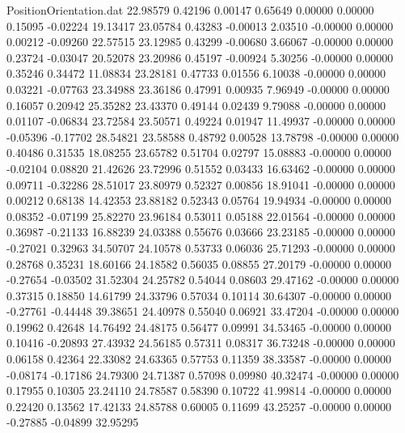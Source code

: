 \begin{filecontents}{PositionOrientation.dat}
  22.98579    0.42196    0.00147     0.65649    0.00000    0.00000    0.15095   -0.02224   19.13417
  23.05784    0.43283   -0.00013     2.03510   -0.00000    0.00000    0.00212   -0.09260   22.57515
  23.12985    0.43299   -0.00680     3.66067   -0.00000    0.00000    0.23724   -0.03047   20.52078
  23.20986    0.45197   -0.00924     5.30256   -0.00000    0.00000    0.35246    0.34472   11.08834
  23.28181    0.47733    0.01556     6.10038   -0.00000    0.00000    0.03221   -0.07763   23.34988
  23.36186    0.47991    0.00935     7.96949   -0.00000    0.00000    0.16057    0.20942   25.35282
  23.43370    0.49144    0.02439     9.79088   -0.00000    0.00000    0.01107   -0.06834   23.72584
  23.50571    0.49224    0.01947    11.49937   -0.00000    0.00000   -0.05396   -0.17702   28.54821
  23.58588    0.48792    0.00528    13.78798   -0.00000    0.00000    0.40486    0.31535   18.08255
  23.65782    0.51704    0.02797    15.08883   -0.00000    0.00000   -0.02104    0.08820   21.42626
  23.72996    0.51552    0.03433    16.63462   -0.00000    0.00000    0.09711   -0.32286   28.51017
  23.80979    0.52327    0.00856    18.91041   -0.00000    0.00000    0.00212    0.68138   14.42353
  23.88182    0.52343    0.05764    19.94934   -0.00000    0.00000    0.08352   -0.07199   25.82270
  23.96184    0.53011    0.05188    22.01564   -0.00000    0.00000    0.36987   -0.21133   16.88239
  24.03388    0.55676    0.03666    23.23185   -0.00000    0.00000   -0.27021    0.32963   34.50707
  24.10578    0.53733    0.06036    25.71293   -0.00000    0.00000    0.28768    0.35231   18.60166
  24.18582    0.56035    0.08855    27.20179   -0.00000    0.00000   -0.27654   -0.03502   31.52304
  24.25782    0.54044    0.08603    29.47162   -0.00000    0.00000    0.37315    0.18850   14.61799
  24.33796    0.57034    0.10114    30.64307   -0.00000    0.00000   -0.27761   -0.44448   39.38651
  24.40978    0.55040    0.06921    33.47204   -0.00000    0.00000    0.19962    0.42648   14.76492
  24.48175    0.56477    0.09991    34.53465   -0.00000    0.00000    0.10416   -0.20893   27.43932
  24.56185    0.57311    0.08317    36.73248   -0.00000    0.00000    0.06158    0.42364   22.33082
  24.63365    0.57753    0.11359    38.33587   -0.00000    0.00000   -0.08174   -0.17186   24.79300
  24.71387    0.57098    0.09980    40.32474   -0.00000    0.00000    0.17955    0.10305   23.24110
  24.78587    0.58390    0.10722    41.99814   -0.00000    0.00000    0.22420    0.13562   17.42133
  24.85788    0.60005    0.11699    43.25257   -0.00000    0.00000   -0.27885   -0.04899   32.95295

\end{filecontents}
